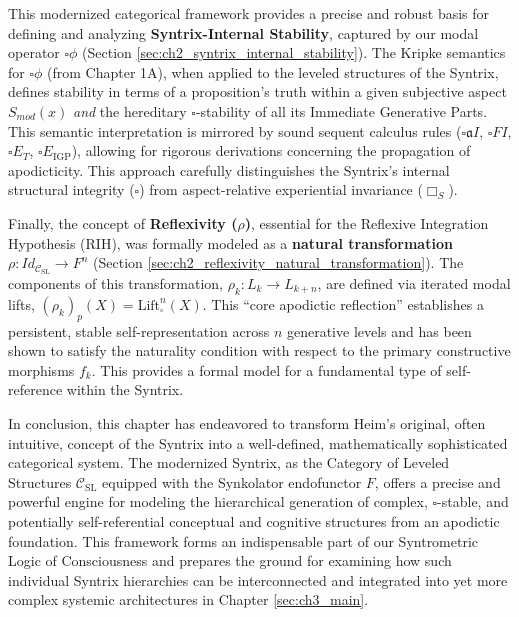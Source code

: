 \documentclass[
    12pt,              %
    a4paper,           %
    headings=normal,   %
    twoside=true,      %
    BCOR=8mm,          %
]{scrbook}
\newcommand{\q}[1]{\enquote{#1}}
\newcommand{\BoxS}{\Box_S}
\newcommand{\BoxSyn}{\square}
\begin{document}
This modernized categorical framework provides a precise and robust basis for defining and analyzing \textbf{Syntrix-Internal Stability}, captured by our modal operator \textbf{\(\BoxSyn \phi\)} (Section \ref{sec:ch2_syntrix_internal_stability}). The Kripke semantics for \(\BoxSyn \phi\) (from Chapter 1A), when applied to the leveled structures of the Syntrix, defines stability in terms of a proposition's truth within a given subjective aspect \(S_{mod}(x)\) \textit{and} the hereditary \(\BoxSyn\)-stability of all its Immediate Generative Parts. This semantic interpretation is mirrored by sound sequent calculus rules (\(\BoxSyn\mathfrak{a}I\), \(\BoxSyn FI\), \(\BoxSyn E_T\), \(\BoxSyn E_{\text{IGP}}\)), allowing for rigorous derivations concerning the propagation of apodicticity. This approach carefully distinguishes the Syntrix's internal structural integrity (\(\BoxSyn\)) from aspect-relative experiential invariance (\(\BoxS\)).

Finally, the concept of \textbf{Reflexivity (\(\rho\))}, essential for the Reflexive Integration Hypothesis (RIH), was formally modeled as a \textbf{natural transformation \(\rho: Id_{\mathcal{C}_{\text{SL}}} \to F^n\)} (Section \ref{sec:ch2_reflexivity_natural_transformation}). The components of this transformation, \(\rho_k: L_k \to L_{k+n}\), are defined via iterated modal lifts, \((\rho_k)_p(X) = \text{Lift}_\BoxSyn^n(X)\). This \q{core apodictic reflection} establishes a persistent, stable self-representation across \(n\) generative levels and has been shown to satisfy the naturality condition with respect to the primary constructive morphisms \(f_k\). This provides a formal model for a fundamental type of self-reference within the Syntrix.

In conclusion, this chapter has endeavored to transform Heim's original, often intuitive, concept of the Syntrix into a well-defined, mathematically sophisticated categorical system. The modernized Syntrix, as the Category of Leveled Structures \(\mathcal{C}_{\text{SL}}\) equipped with the Synkolator endofunctor \(F\), offers a precise and powerful engine for modeling the hierarchical generation of complex, \(\BoxSyn\)-stable, and potentially self-referential conceptual and cognitive structures from an apodictic foundation. This framework forms an indispensable part of our Syntrometric Logic of Consciousness and prepares the ground for examining how such individual Syntrix hierarchies can be interconnected and integrated into yet more complex systemic architectures in Chapter \ref{sec:ch3_main}.
\end{document}
